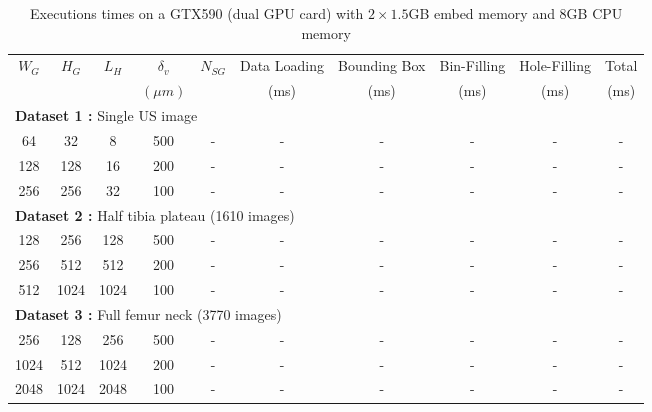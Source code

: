 \documentclass[12pt,journal,compsoc]{IEEEtran}
\begin{document}
\begin{table}[!ht]
\renewcommand{\arraystretch}{1.3}
\caption{Executions times on a GTX590 (dual GPU card) with $2\times1.5$GB embed memory and 8GB CPU memory}
\label{results_gtx590}
\centering
\begin{tabular}{|c|c|c||c|c||c|c|c|c||c|}
\hline
$W_G$ & $H_G$ & $L_H$ & $\delta_v$ & $N_{SG}$ & Data Loading & Bounding Box & Bin-Filling & Hole-Filling & Total \\
      &&&$(\mu m)$&&(ms)&(ms)&(ms)&(ms)&(ms)\\
\hline
\multicolumn{10}{|l|}{\textbf{Dataset 1 :} Single US image}\\
\hline
64&32&8&500&-&-&-&-&-&-\\
\hline
128&128&16&200&-&-&-&-&-&-\\
\hline
256&256&32&100&-&-&-&-&-&-\\
\hline
\hline
\multicolumn{10}{|l|}{\textbf{Dataset 2 :} Half tibia plateau (1610 images)}\\
\hline
128&256&128&500&-&-&-&-&-&-\\
\hline
256&512&512&200&-&-&-&-&-&-\\
\hline
512&1024&1024&100&-&-&-&-&-&-\\
\hline
\hline
\multicolumn{10}{|l|}{\textbf{Dataset 3 :} Full femur neck (3770 images)}\\
\hline
256&128&256&500&-&-&-&-&-&-\\
\hline
1024&512&1024&200&-&-&-&-&-&-\\
\hline
2048&1024&2048&100&-&-&-&-&-&-\\
\hline
\end{tabular}
\end{table}
\end{document}
